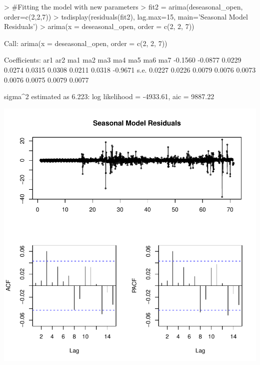 \documentclass{article}
\begin{document}
\begin{Schunk}
\begin{Sinput}
> #Fitting the model with new parameters
> fit2 = arima(deseasonal_open, order=c(2,2,7))
> tsdisplay(residuals(fit2), lag.max=15, main='Seasonal Model Residuals')
> arima(x = deseasonal_open, order = c(2, 2, 7))
\end{Sinput}
\begin{Soutput}
Call:
arima(x = deseasonal_open, order = c(2, 2, 7))

Coefficients:
          ar1      ar2     ma1     ma2     ma3     ma4     ma5     ma6      ma7
      -0.1560  -0.0877  0.0229  0.0274  0.0315  0.0308  0.0211  0.0318  -0.9671
s.e.   0.0227   0.0226  0.0079  0.0076  0.0073  0.0076  0.0075  0.0079   0.0077

sigma^2 estimated as 6.223:  log likelihood = -4933.61,  aic = 9887.22
\end{Soutput}
\end{Schunk}
\includegraphics{Report-022}
\end{document}
